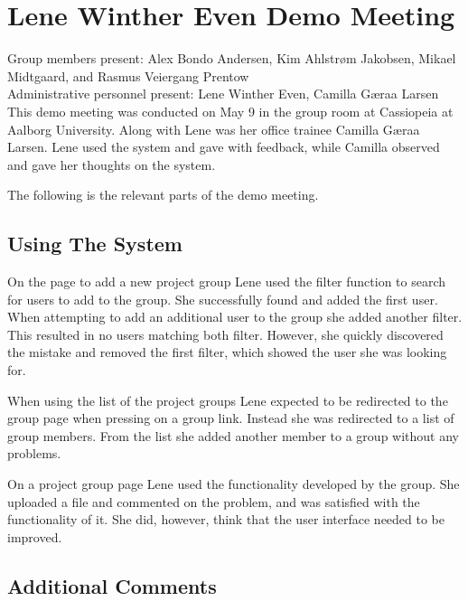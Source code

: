 \section{Lene Winther Even Demo Meeting}
\label{sec:lenedemotwo}
Group members present: Alex Bondo Andersen, Kim Ahlstr\o{}m Jakobsen, Mikael Midtgaard, and Rasmus Veiergang Prentow\\
Administrative personnel present: Lene Winther Even, Camilla G\ae{}raa Larsen\\

This demo meeting was conducted on May 9\ths{} in the group room at Cassiopeia at Aalborg University.
Along with Lene was her office trainee Camilla G\ae{}raa Larsen. 
Lene used the system and gave with feedback, while Camilla observed and gave her thoughts on the system.

The following is the relevant parts of the demo meeting.

\subsection{Using The System}
On the page to add a new project group Lene used the filter function to search for users to add to the group.
She successfully found and added the first user.
When attempting to add an additional user to the group she added another filter. 
This resulted in no users matching both filter. 
However, she quickly discovered the mistake and removed the first filter, which showed the user she was looking for.

When using the list of the project groups Lene expected to be redirected to the group page when pressing on a group link.
Instead she was redirected to a list of group members.
From the list she added another member to a group without any problems.

On a project group page Lene used the functionality developed by the \supervisorgroup group.
She uploaded a file and commented on the problem, and was satisfied with the functionality of it.
She did, however, think that the user interface needed to be improved.

\subsection{Additional Comments}
